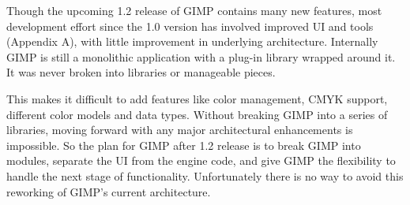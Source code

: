 Though the upcoming 1.2 release of GIMP contains many new features, most
development effort since the 1.0 version has involved improved UI and tools
(Appendix A), with little improvement in underlying architecture. Internally
GIMP is still a monolithic application with a plug-in library wrapped around
it. It was never broken into libraries or manageable pieces. 

This makes it difficult to add features like color management, CMYK support,
different color models and data types. Without breaking GIMP into a series of
libraries, moving forward with any major architectural enhancements is
impossible. So the plan for GIMP after 1.2 release is to break GIMP into
modules, separate the UI from the engine code, and give GIMP the flexibility to
handle the next stage of functionality. Unfortunately there is no way to avoid
this reworking of GIMP's current architecture.
